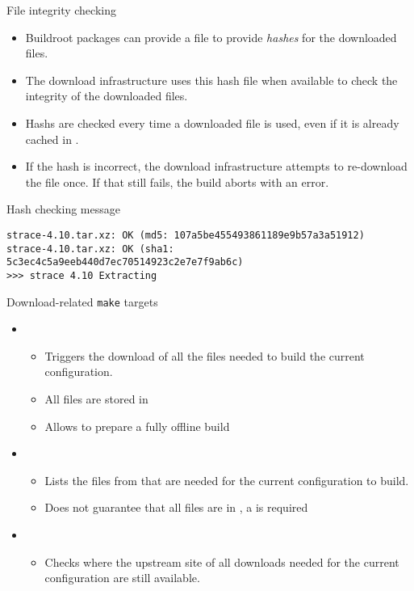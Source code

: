 \begin{frame}[fragile]{File integrity checking}
  \begin{itemize}
  \item Buildroot packages can provide a  file to provide
    {\em hashes} for the downloaded files.
  \item The download infrastructure uses this hash file when available
    to check the integrity of the downloaded files.
  \item Hashs are checked every time a downloaded file is used, even
    if it is already cached in .
  \item If the hash is incorrect, the download infrastructure attempts
    to re-download the file once. If that still fails, the build
    aborts with an error.
  \end{itemize}

  \begin{block}{Hash checking message}
{\scriptsize
\begin{verbatim}
strace-4.10.tar.xz: OK (md5: 107a5be455493861189e9b57a3a51912)
strace-4.10.tar.xz: OK (sha1: 5c3ec4c5a9eeb440d7ec70514923c2e7e7f9ab6c)
>>> strace 4.10 Extracting
\end{verbatim}}
  \end{block}
\end{frame}

\begin{frame}{Download-related {\tt make} targets}
  \begin{itemize}
  \item {}
    \begin{itemize}
    \item Triggers the download of all the files needed to build the
      current configuration.
    \item All files are stored in 
    \item Allows to prepare a fully offline build
    \end{itemize}
  \item {}
    \begin{itemize}
    \item Lists the files from  that are needed for
      the current configuration to build.
    \item Does not guarantee that all files are in , a
       is required
    \end{itemize}
  \item {}
    \begin{itemize}
    \item Checks where the upstream site of all downloads needed for
      the current configuration are still available.
    \end{itemize}
  \end{itemize}
\end{frame}
